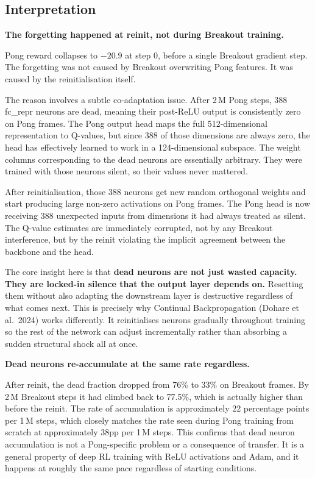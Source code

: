 \documentclass[11pt,a4paper]{article}
\begin{document}
\subsection*{Interpretation}

\textbf{The forgetting happened at reinit, not during Breakout training.}

\begin{insight}
Pong reward collapses to $-20.9$ at step 0, before a single Breakout gradient step.
The forgetting was not caused by Breakout overwriting Pong features. It was caused by
the reinitialisation itself.
\end{insight}

The reason involves a subtle co-adaptation issue. After 2\,M Pong steps, 388 fc\_repr
neurons are dead, meaning their post-ReLU output is consistently zero on Pong frames.
The Pong output head maps the full 512-dimensional representation to Q-values, but since
388 of those dimensions are always zero, the head has effectively learned to work in a
124-dimensional subspace. The weight columns corresponding to the dead neurons are
essentially arbitrary. They were trained with those neurons silent, so their values never
mattered.

After reinitialisation, those 388 neurons get new random orthogonal weights and start
producing large non-zero activations on Pong frames. The Pong head is now receiving 388
unexpected inputs from dimensions it had always treated as silent. The Q-value estimates
are immediately corrupted, not by any Breakout interference, but by the reinit violating
the implicit agreement between the backbone and the head.

The core insight here is that \textbf{dead neurons are not just wasted capacity. They are
locked-in silence that the output layer depends on.} Resetting them without also adapting
the downstream layer is destructive regardless of what comes next. This is precisely why
Continual Backpropagation (Dohare et al.\ 2024) works differently. It reinitialises
neurons gradually throughout training so the rest of the network can adjust incrementally
rather than absorbing a sudden structural shock all at once.

\textbf{Dead neurons re-accumulate at the same rate regardless.}

After reinit, the dead fraction dropped from 76\% to 33\% on Breakout frames. By 2\,M
Breakout steps it had climbed back to 77.5\%, which is actually higher than before the
reinit. The rate of accumulation is approximately 22 percentage points per 1\,M steps,
which closely matches the rate seen during Pong training from scratch at approximately
38pp per 1\,M steps. This confirms that dead neuron accumulation is not a Pong-specific
problem or a consequence of transfer. It is a general property of deep RL training with
ReLU activations and Adam, and it happens at roughly the same pace regardless of starting
conditions.
\end{document}
